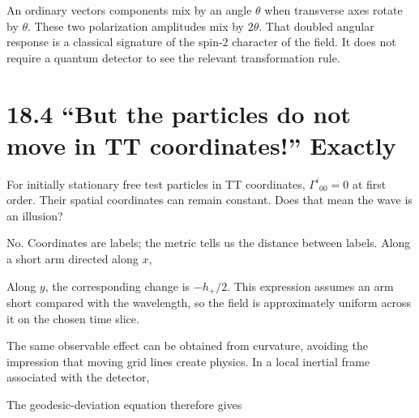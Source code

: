 \documentclass[
  11pt,
  letterpaper,
  oneside,
  openany]{scrbook}
\begin{document}
An ordinary vector\textquotesingle s components mix by an angle
\(\theta\) when transverse axes rotate by \(\theta\). These two
polarization amplitudes mix by \(2\theta\). That doubled angular
response is a classical signature of the spin-2 character of the field.
It does not require a quantum detector to see the relevant
transformation rule.

\hypertarget{but-the-particles-do-not-move-in-tt-coordinates-exactly}{%
\section{18.4 ``But the particles do not move in TT coordinates!''
Exactly}\label{but-the-particles-do-not-move-in-tt-coordinates-exactly}}

For initially stationary free test particles in TT coordinates,
\(\Gamma^i{}_{00}=0\) at first order. Their spatial coordinates can
remain constant. Does that mean the wave is an illusion?

No. Coordinates are labels; the metric tells us the distance between
labels. Along a short arm directed along \(x\),

\begin{center}
\begingroup
{}
\ifdim\wd\grmathbox>\linewidth
\resizebox{\linewidth}{!}{\usebox{\grmathbox}}
\else\usebox{\grmathbox}\fi
\endgroup
\end{center}

Along \(y\), the corresponding change is \(-h_+/2\). This expression
assumes an arm short compared with the wavelength, so the field is
approximately uniform across it on the chosen time slice.

The same observable effect can be obtained from curvature, avoiding the
impression that moving grid lines create physics. In a local inertial
frame associated with the detector,

\begin{center}
\begingroup
{}
\ifdim\wd\grmathbox>\linewidth
\resizebox{\linewidth}{!}{\usebox{\grmathbox}}
\else\usebox{\grmathbox}\fi
\endgroup
\end{center}

The geodesic-deviation equation therefore gives
\end{document}
